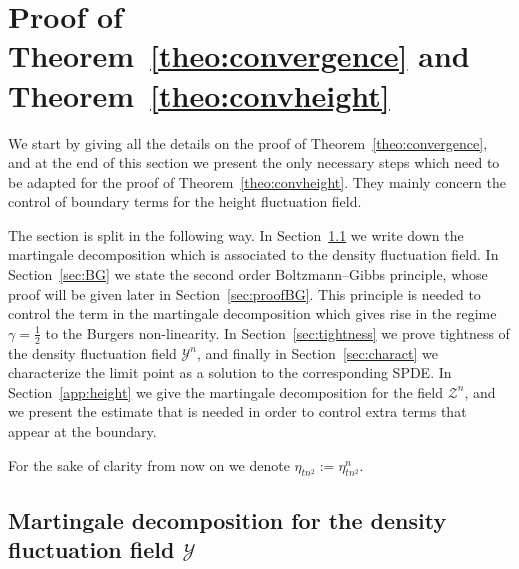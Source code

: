 \documentclass[AHL,Unicode,longabstracts]{cedram}
\newcommand{\mc}[1]{{\mathcal #1}}
\renewcommand{\mc}[1]{{\mathcal #1}}
\begin{document}
\section{Proof of Theorem~\ref{theo:convergence} and Theorem~\ref{theo:convheight}}
\label{s4}

We start by giving all the details on the proof of Theorem~\ref{theo:convergence}, and at the end of this section we present the only necessary steps which need to be adapted for the proof of Theorem~\ref{theo:convheight}. They mainly concern the control of boundary terms for the height fluctuation field.

The section is split in the following way. In Section~\ref{sec:martingale} we write down the martingale decomposition which is associated to the density fluctuation field. In Section~\ref{sec:BG} we state the second order Boltzmann--Gibbs principle, whose proof will be given later in Section~\ref{sec:proofBG}. This principle is needed to control the term in the martingale decomposition which gives rise in the regime $\gamma=\frac12$ to the Burgers non-linearity. In Section~\ref{sec:tightness} we prove tightness of the density fluctuation field $\mc Y^n$, and finally in Section~\ref{sec:charact} we characterize the limit point as a solution to the corresponding SPDE. In Section~\ref{app:height} we give the martingale decomposition for the field $\mc Z^n$, and we present the estimate that is needed in order to control extra terms that appear at the boundary.

For the sake of clarity from now on we denote $\eta_{tn^2}:=\eta^n_{tn^2}$.

\subsection{Martingale decomposition for the density fluctuation field \texorpdfstring{$\mc Y$}{Y}}\label{sec:martingale}
\end{document}
